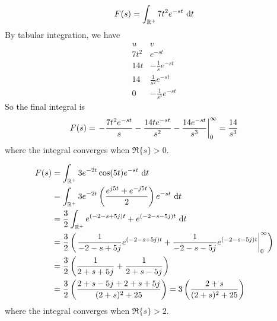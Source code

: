 \documentclass{article}
\begin{document}
\question{}

\begin{subparts}
    \item \begin{equation}
        F(s) = \int_{\mathbb{R}^+} 7t^2 e^{-st} \, \dd{t}
    \end{equation}
    By tabular integration, we have
    \begin{equation}
        \begin{array}{c|c}
            u & v \\
            \hline
            7t^2 & e^{-st} \\
            14t & -\frac{1}{s} e^{-st} \\
            14 & \frac{1}{s^2} e^{-st} \\
            0 & -\frac{1}{s^3} e^{-st}
        \end{array}
    \end{equation}
    So the final integral is
    \begin{equation}
        F(s) = \eval{-\frac{7t^2 e^{-st}}{s} - \frac{14t e^{-st}}{s^2} - \frac{14 e^{-st}}{s^3}}_0^\infty = \frac{14}{s^3}
    \end{equation}
    where the integral converges when \(\Re\{s\} > 0\).
    \item \begin{align}
        F(s) &= \int_{\R^+} 3e^{-2t} \cos(5t) e^{-st} \, \dd{t} \\
        &= \int_{\R^+} 3e^{-2t} \left(\frac{e^{j 5t} + e^{-j 5t}}{2}\right) e^{-st} \, \dd{t} \\
        &= \frac{3}{2} \int_{\R^+} e^{(-2 - s + 5j) t} + e^{(-2 - s - 5j) t} \, \dd{t} \\
        &= \frac{3}{2} \left(\eval{\frac{1}{-2 - s + 5j} e^{(-2 - s + 5j) t} + \frac{1}{-2 - s - 5j} e^{(-2 - s - 5j) t}}_0^\infty\right) \\
        &= \frac{3}{2} \left(\frac{1}{2 + s + 5j} + \frac{1}{2 + s - 5j}\right) \\
        &= \frac{3}{2} \left(\frac{2 + s - 5j + 2 + s + 5j}{(2 + s)^2 + 25}\right) = 3 \left(\frac{2 + s}{(2 + s)^2 + 25}\right)
    \end{align}
    where the integral converges when \(\Re\{s\} > 2\).
\end{subparts}

\question{}
\end{document}

